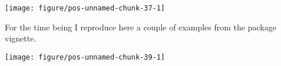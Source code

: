 \documentclass[paper=a4,10pt,div=17,headsepline,BCOR=12mm,twoside,open=right]{scrbook}\usepackage{knitr}
\begin{document}
\begin{knitrout}\footnotesize
{}\color{fgcolor}\begin{kframe}
\begin{alltt}
  \hlopt{+}
  \hlstd{()} \hlopt{+}
  \hlstd{(} \hlstd{=} \hlstd{,}  \hlstd{=} \hlstd{)}
\end{alltt}
\end{kframe}

{\centering \texttt{[image: figure/pos-unnamed-chunk-37-1]} 

}



\end{knitrout}

For the time being I reproduce here a couple of examples from the package
vignette.



\begin{knitrout}\footnotesize
{}\color{fgcolor}\begin{kframe}
\begin{alltt}
  \hlopt{+}
  \hlstd{(} \hlstd{=} \hlstd{)} \hlopt{+}
  \hlstd{(}\hlstd{(} \hlstd{=} 
\end{alltt}
\end{kframe}

{\centering \texttt{[image: figure/pos-unnamed-chunk-39-1]} 

}



\end{knitrout}
\end{document}
